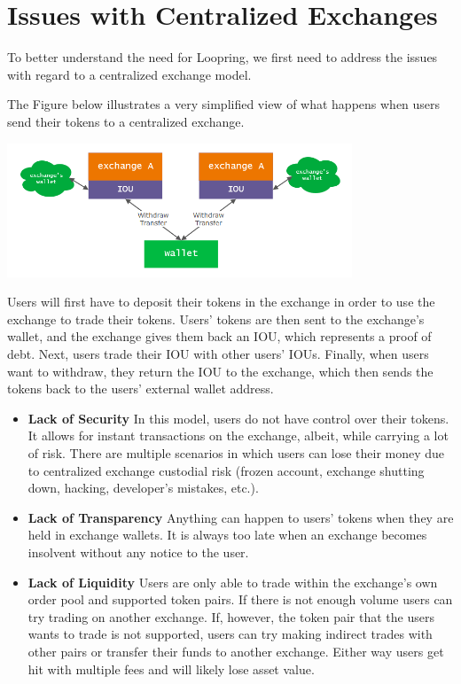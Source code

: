 \documentclass[UTF8,nofonts]{article}
\makeatletter
\newenvironment{figurehere}
 {\def\@captype{figure}}
 {}
\makeatother
\begin{document}
\section{Issues with Centralized Exchanges}

To better understand the need for Loopring, we first need to address the issues with regard to a centralized exchange model.

The Figure below illustrates a very simplified view of what happens when users send their tokens to a centralized exchange.


\begin{center}
\begin{figurehere}
\includegraphics[height=4cm]{images/centralized-model.png}
\label{fig: Loopringrotocol}
\end{figurehere}
\end{center}

Users will first have to deposit their tokens in the exchange in order to use the exchange to trade their tokens. Users’ tokens are then sent to the exchange's wallet, and the exchange gives them back an IOU, which represents a proof of debt. Next, users trade their IOU with other users’ IOUs. Finally, when users want to withdraw, they return the IOU to the exchange, which then sends the tokens back to the users’ external wallet address.

\begin{itemize}

 \item \textbf{Lack of Security} In this model, users do not have control over their tokens. It allows for instant transactions on the exchange, albeit, while carrying a lot of risk. There are multiple scenarios in which users can lose their money due to centralized exchange custodial risk (frozen account, exchange shutting down, hacking, developer's mistakes, etc.).

 \item \textbf{Lack of Transparency}
Anything can happen to users’ tokens when they are held in exchange wallets. It is always too late when an exchange becomes insolvent without any notice to the user.

 \item \textbf{Lack of Liquidity}
Users are only able to trade within the exchange’s own order pool and supported token pairs. If there is not enough volume users can try trading on another exchange. If, however, the token pair that the users wants to trade is not supported, users can try making indirect trades with other pairs or transfer their funds to another exchange. Either way users get hit with multiple fees and will likely lose asset value.
\end{itemize}
\end{document}
